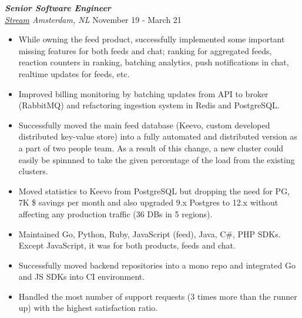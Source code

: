 \documentclass[line, margin]{res}
\begin{document}
\begin{resume}
\begin{itemize}
\end{itemize}

{\sl \textbf{Senior Software Engineer} \\ \href{https://www.getstream.io}{Stream} Amsterdam, NL} \hfill November 19 - March 21 \\
\vspace{-0.3cm}
\begin{itemize}
  \item While owning the feed product, successfully implemented some important missing features for both feeds and chat; ranking for aggregated feeds, reaction counters in ranking, batching analytics, push notifications in chat, realtime updates for feeds, etc.
  \item Improved billing monitoring by batching updates from API to broker (RabbitMQ) and refactoring ingestion system in Redis and PostgreSQL.
  \item Successfully moved the main feed database (Keevo, custom developed distributed key-value store) into a fully automated and distributed version as a part of two people team. As a result of this change, a new cluster could easily be spinnned to take the given percentage of the load from the existing clusters.
  \item Moved statistics to Keevo from PostgreSQL but dropping the need for PG, 7K \$ savings per month and also upgraded 9.x Postgres to 12.x without affecting any production traffic (36 DBs in 5 regions).
  \item Maintained Go, Python, Ruby, JavaScript (feed), Java, C\#, PHP SDKs. Except JavaScript, it was for both products, feeds and chat. 
  \item Successfully moved backend repositories into a mono repo and integrated Go and JS SDKs into CI environment.
  \item Handled the most number of support requests (3 times more than the runner up) with the highest satisfaction ratio.
  
\end{itemize}



\end{resume}
\end{document}

